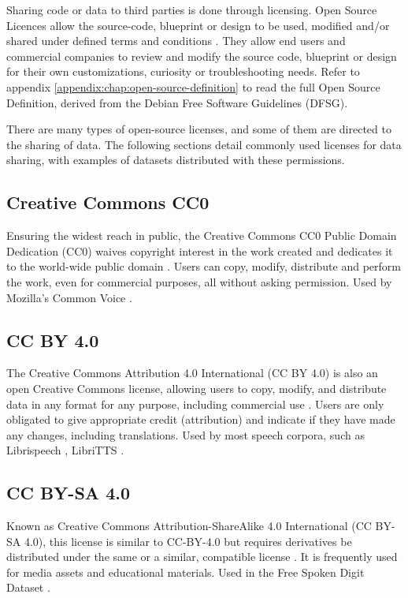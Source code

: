 Sharing code or data to third parties is done through licensing. Open Source Licences allow the source-code, blueprint or design to be used, modified and/or shared under defined terms and conditions \cite{perens1999open}. They allow end users and commercial companies to review and modify the source code, blueprint or design for their own customizations, curiosity or troubleshooting needs. Refer to appendix \ref{appendix:chap:open-source-definition} to read the full Open Source Definition, derived from the Debian Free Software Guidelines (DFSG).

There are many types of open-source licenses, and some of them are directed to the sharing of data. The following sections detail commonly used licenses for data sharing, with examples of datasets distributed with these permissions.

\subsection{Creative Commons CC0}

Ensuring the widest reach in public, the Creative Commons CC0 Public Domain Dedication (CC0) waives copyright interest in the work created and dedicates it to the world-wide public domain \cite{licenses-cc0}. Users can copy, modify, distribute and perform the work, even for commercial purposes, all without asking permission. Used by Mozilla's Common Voice \cite{ardila2019common}.

\subsection{CC BY 4.0}

The Creative Commons Attribution 4.0 International (CC BY 4.0) is also an open Creative Commons license, allowing users to copy, modify, and distribute data in any format for any purpose, including commercial use \cite{licenses-ccby40}. Users are only obligated to give appropriate credit (attribution) and indicate if they have made any changes, including translations. Used by most speech corpora, such as Librispeech \cite{panayotov2015librispeech}, LibriTTS \cite{zen2019libritts}.

\subsection{CC BY-SA 4.0}

Known as Creative Commons Attribution-ShareAlike 4.0 International (CC BY-SA 4.0), this license is similar to CC-BY-4.0 but requires derivatives be distributed under the same or a similar, compatible license \cite{licenses-ccby-sa40}. It is frequently used for media assets and educational materials. Used in the Free Spoken Digit Dataset \cite{dataset-free-spoken-digit}.

